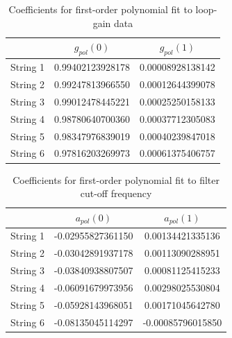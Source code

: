 \documentclass[main.tex]{subfiles}
\begin{document}
\begin{table}[h]
\centering
\begin{tabular}{|c| c| c|} 
 \hline
     & $g_{pol}(0)$ & $g_{pol}(1)$ \\ [0.5ex] 
 \hline
 String 1 & 0.99402123928178  & 0.00008928138142 \\ 
 String 2 & 0.99247813966550  & 0.00012644399078 \\ 
 String 3 & 0.99012478445221  & 0.00025250158133 \\ 
 String 4 & 0.98780640700360  & 0.00037712305083 \\ 
 String 5 & 0.98347976839019  & 0.00040239847018 \\ 
 String 6 & 0.97816203269973  & 0.00061375406757 \\ 
 \hline
\end{tabular}
\caption{Coefficients for first-order polynomial fit to loop-gain data }
\label{tab:g_coeff}
\end{table}

\begin{table}[h]
\centering
\begin{tabular}{|c| c| c|} 
 \hline
     & $a_{pol}(0)$ & $a_{pol}(1)$ \\ [0.5ex] 
 \hline
 String 1 & -0.02955827361150  & 0.00134421335136 \\ 
 String 2 & -0.03042891937178  & 0.00113090288951 \\ 
 String 3 & -0.03840938807507  & 0.00081125415233 \\ 
 String 4 & -0.06091679973956  & 0.00298025530804 \\ 
 String 5 & -0.05928143968051  & 0.00171045642780 \\ 
 String 6 & -0.08135045114297  & -0.00085796015850 \\ 
 \hline
\end{tabular}
\caption{Coefficients for first-order polynomial fit to filter cut-off frequency }
\label{tab:a_coeff}
\end{table}
\end{document}
